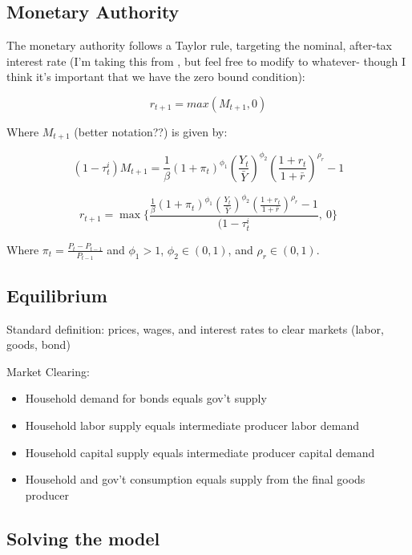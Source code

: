\documentclass[article,11pt,letterpaper,fleqn]{article}
\theoremstyle{definition}
\numberwithin{equation}{section}
\newcommand{\cn}{\citeasnoun} %
\begin{document}
\subsection{Monetary Authority}

The monetary authority follows a Taylor rule, targeting the nominal, after-tax interest rate (I'm taking this from \cn{CER2010}, but feel free to modify to whatever- though I think it's important that we have the zero bound condition):

\begin{equation}
r_{t+1} = max(M_{t+1},0)
\end{equation}

Where $M_{t+1}$ (better notation??) is given by:

\begin{equation}
(1-\tau^{i}_{t})M_{t+1} = \frac{1}{\beta}(1+\pi_{t})^{\phi_{1}}\left(\frac{Y_{t}}{\bar{Y}}\right)^{\phi_{2}}\left(\frac{1+r_{t}}{1+\bar{r}}\right)^{\rho_{r}} - 1
\end{equation}

\begin{equation*}
r_{t+1} = \max\Biggl\{\frac{\frac{1}{\beta}(1+\pi_{t})^{\phi_{1}}\left(\frac{Y_{t}}{\bar{Y}}\right)^{\phi_{2}}\left(\frac{1+r_{t}}{1+\bar{r}}\right)^{\rho_{r}} - 1}{(1-\tau^{i}_{t}},\: 0\Biggr\}
\end{equation*}

Where $\pi_{t}=\frac{P_{t}-P_{t-1}}{P_{t-1}}$ and $\phi_{1} > 1$,  $\phi_{2}\in(0,1)$, and  $\rho_{r}\in(0,1)$.

\subsection{Equilibrium}


Standard definition: prices, wages, and interest rates to clear markets (labor, goods, bond)

Market Clearing:
\begin{itemize}
\item Household demand for bonds equals gov't supply
\item Household labor supply equals intermediate producer labor demand
\item Household capital supply equals intermediate producer capital demand
\item Household and gov't consumption equals supply from the final goods producer
\end{itemize}

\subsection{Solving the model}
\end{document}
